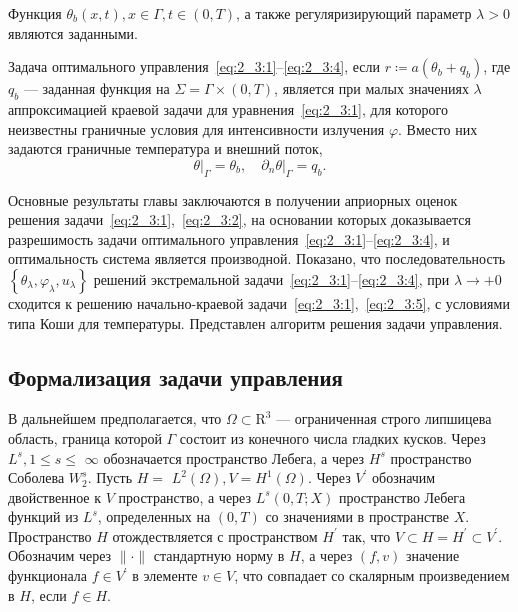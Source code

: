 Функция $\theta_{b}(x, t), x \in \Gamma, t \in(0, T)$,
а также регуляризирующий параметр $\lambda>0$ являются заданными.

Задача оптимального управления~\eqref{eq:2_3:1}--\eqref{eq:2_3:4},
если $r \coloneqq a\left(\theta_{b}+q_{b}\right)$,
где $q_{b}$ — заданная функция на $\Sigma =\Gamma \times(0, T)$,
является при малых значениях $\lambda$ аппроксимацией краевой
задачи для уравнения~\eqref{eq:2_3:1},
для которого неизвестны граничные условия для интенсивности излучения $\varphi$.
Вместо них задаются граничные температура и внешний поток,
\begin{equation}
    \label{eq:2_3:5}
    \left.\theta\right|_{\Gamma}=\theta_{b},\left.\quad \partial_{n} \theta\right|_{\Gamma}=q_{b}.
\end{equation}

Основные результаты главы заключаются в получении априорных
оценок решения задачи~\eqref{eq:2_3:1},~\eqref{eq:2_3:2},
на основании которых доказывается разрешимость задачи
оптимального управления~\eqref{eq:2_3:1}--\eqref{eq:2_3:4},
и оптимальность система является производной.
Показано, что последовательность
$\left\{\theta_{\lambda}, \varphi_{\lambda}, u_{\lambda}\right\}$
решений экстремальной задачи~\eqref{eq:2_3:1}--\eqref{eq:2_3:4},
при $ \lambda \rightarrow+0$
сходится к решению начально-краевой задачи~\eqref{eq:2_3:1},~\eqref{eq:2_3:5},
с условиями типа Коши для температуры.
Представлен алгоритм решения задачи управления.

\subsection{Формализация задачи управления}\label{subsec:ch2/sec3/formalization}
В дальнейшем предполагается,
что $\Omega \subset \mathrm{R}^{3}$ — ограниченная строго липшицева область,
граница которой $\Gamma$ состоит из конечного числа гладких кусков.
Через $L^{s}, 1 \leq s \leq$ $\infty$
обозначается пространство Лебега, а через $H^{s}$ пространство Соболева $W_{2}^{s}$.
Пусть $H=$ $L^{2}(\Omega), V=H^{1}(\Omega)$.
Через $V^{\prime}$ обозначим двойственное к $V$ пространство, а через $L^{s}(0, T; X)$
пространство Лебега функций из $L^{s}$, определенных на $(0, T)$ со значениями в пространстве $X$.
Пространство $H$ отождествляется с пространством
$H^{\prime}$ так, что $V \subset H=H^{\prime} \subset V^{\prime}$.
Обозначим через $\|\cdot\|$ стандартную норму в $H$, а через $(f, v)$
значение функционала $f \in V^{\prime}$ в элементе $v \in V$,
что совпадает со скалярным произведением в $H$, если $f \in H$.


